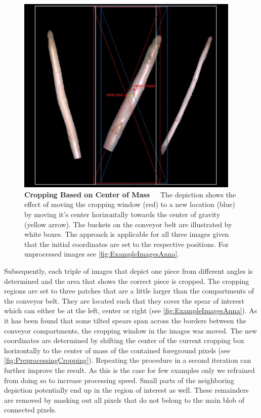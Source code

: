\begin{figure}[!ht]
	\centering
	\includegraphics[width=0.95\textwidth]{Figures/chapter03/preprocessing_cropping.png}
	\decoRule
	\caption[Cropping Based on Center of Mass]{\textbf{Cropping Based on Center of Mass}~~~The depiction shows the effect of moving the cropping window (red) to a new location (blue) by moving it's center horizontally towards the center of gravity (yellow arrow). The buckets on the conveyor belt are illustrated by white boxes. The approach is applicable for all three images given that the initial coordinates are set to the respective positions. For unprocessed images see \autoref{fig:ExampleImagesAnna}.}
	\label{fig:PreprocessingCropping}
\end{figure}

\bigskip
Subsequently, each triple of images that depict one piece from different angles is determined and the area that shows the correct piece is cropped. The cropping regions are set to three patches that are a little larger than the compartments of the conveyor belt. They are located such that they cover the spear of interest which can either be at the left, center or right (see \autoref{fig:ExampleImagesAnna}). As it has been found that some tilted spears span across the borders between the conveyor compartments, the cropping window in the images was moved. The new coordinates are determined by shifting the center of the current cropping box horizontally to the center of mass of the contained foreground pixels (see \autoref{fig:PreprocessingCropping}). Repeating the procedure in a second iteration can further improve the result. As this is the case for few examples only we refrained from doing so to increase processing speed. Small parts of the neighboring depiction potentially end up in the region of interest as well. These remainders are removed by masking out all pixels that do not belong to the main blob of connected pixels.

